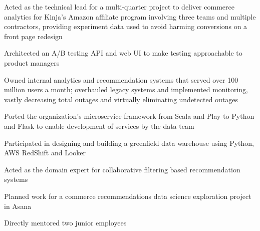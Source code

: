 \begin{job}

  \begin{accomplishments}
    \item Acted as the technical lead for a multi-quarter project to deliver
    commerce analytics for Kinja's Amazon affiliate program involving three
    teams and multiple contractors, providing experiment data used to avoid
    harming conversions on a front page redesign
    \item Architected an A/B testing API and web UI to make testing approachable
    to product managers
    \item Owned internal analytics and recommendation systems that served over
    100 million users a month; overhauled legacy systems and implemented
    monitoring, vastly decreasing total outages and virtually eliminating
    undetected outages
  \end{accomplishments}
  \begin{extendedaccomplishments}
    \item Ported the organization's microservice framework from Scala and Play
    to Python and Flask to enable development of services by the data team
    \item Participated in designing and building a greenfield data warehouse
    using Python, AWS RedShift and Looker
    \item Acted as the domain expert for collaborative filtering based
    recommendation systems
    \item Planned work for a commerce recommendations data science exploration
    project in Asana
    \item Directly mentored two junior employees
  \end{extendedaccomplishments}
\end{job}
